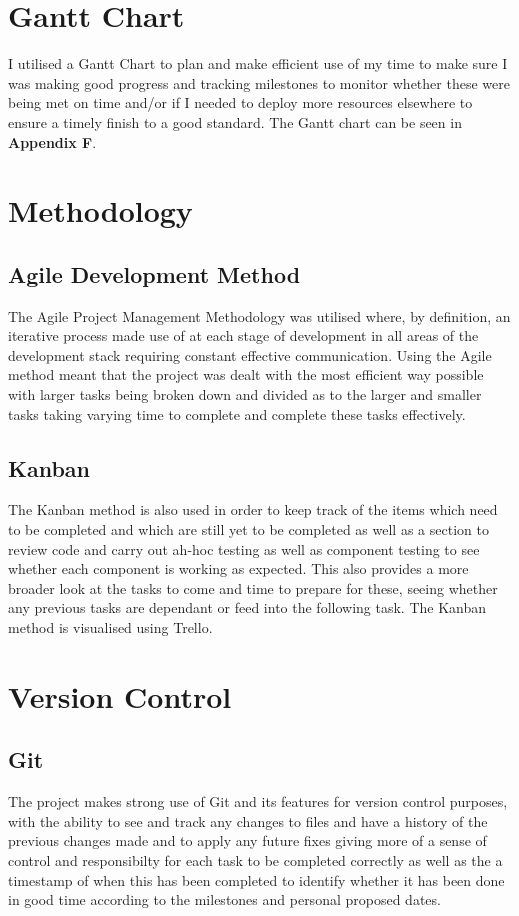 \documentclass[oneside]{report}
\begin{document}
	\section{Gantt Chart}
	I utilised a Gantt Chart to plan and make efficient use of my time to make sure I was making good progress and tracking milestones to monitor whether these were being met on time and/or if I needed to deploy more resources elsewhere to ensure a timely finish to a good standard. The Gantt chart can be seen in \textbf{Appendix F}.

	\section{Methodology}
		\subsection{Agile Development Method}
The Agile Project Management Methodology was utilised where, by definition, an iterative process made use of at each stage of development in all areas of the development stack requiring constant effective communication. Using the Agile method meant that the project was dealt with the most efficient way possible with larger tasks being broken down and divided as to the larger and smaller tasks taking varying time to complete and complete these tasks effectively.

		\subsection{Kanban}
The Kanban method is also used in order to keep track of the items which need to be completed and which are still yet to be completed as well as a section to review code and carry out ah-hoc testing as well as component testing to see whether each component is working as expected. This also provides a more broader look at the tasks to come and time to prepare for these, seeing whether any previous tasks are dependant or feed into the following task. The Kanban method is visualised using Trello.

	\section{Version Control}
		\subsection{Git}
The project makes strong use of Git and its features for version control purposes, with the ability to see and track any changes to files and have a history of the previous changes made and to apply any future fixes giving more of a sense of control and responsibilty for each task to be completed correctly as well as the a timestamp of when this has been completed to identify whether it has been done in good time according to the milestones and personal proposed dates.
\end{document}
